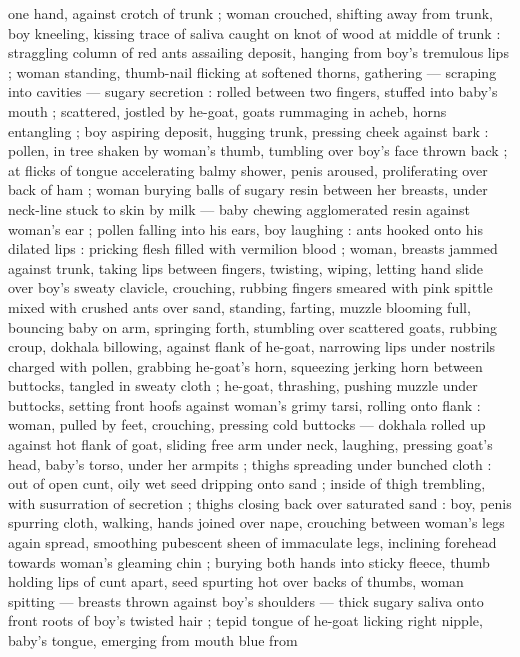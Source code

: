 one hand, against crotch of trunk ; woman crouched, shifting away 
from trunk, boy kneeling, kissing trace of saliva caught on knot of 
wood at middle of trunk : straggling column of red ants assailing 
deposit, hanging from boy's tremulous lips ; woman standing, 
thumb-nail flicking at softened thorns, gathering --- scraping into 
cavities --- sugary secretion : rolled between two fingers, stuffed into 
baby's mouth ; scattered, jostled by he-goat, goats rummaging in 
acheb, horns entangling ; boy aspiring deposit, hugging trunk, 
pressing cheek against bark : pollen, in tree shaken by woman's 
thumb, tumbling over boy's face thrown back ; at flicks of tongue 
accelerating balmy shower, penis aroused, proliferating over back of 
ham ; woman burying balls of sugary resin between her breasts, 
under neck-line stuck to skin by milk --- baby chewing agglomerated 
resin against woman's ear ; pollen falling into his ears, boy laughing 
: ants hooked onto his dilated lips : pricking flesh filled with vermilion 
blood ; woman, breasts jammed against trunk, taking lips between 
fingers, twisting, wiping, letting hand slide over boy's sweaty clavicle, 
crouching, rubbing fingers smeared with pink spittle mixed with 
crushed ants over sand, standing, farting, muzzle blooming full, 
bouncing baby on arm, springing forth, stumbling over scattered 
goats, rubbing croup, dokhala billowing, against flank of he-goat, 
narrowing lips under nostrils charged with pollen, grabbing he-goat's 
horn, squeezing jerking horn between buttocks, tangled in sweaty 
cloth ; he-goat, thrashing, pushing muzzle under buttocks, setting 
front hoofs against woman's grimy tarsi, rolling onto flank : woman, 
pulled by feet, crouching, pressing cold buttocks --- dokhala rolled 
up against hot flank of goat, sliding free arm under neck, laughing, 
pressing goat's head, baby's torso, under her armpits ; thighs 
spreading under bunched cloth : out of open cunt, oily wet seed 
dripping onto sand ; inside of thigh trembling, with susurration of 
secretion ; thighs closing back over saturated sand : boy, penis 
spurring cloth, walking, hands joined over nape, crouching between 
woman's legs again spread, smoothing pubescent sheen of 
immaculate legs, inclining forehead towards woman's gleaming chin 
; burying both hands into sticky fleece, thumb holding lips of cunt 
apart, seed spurting hot over backs of thumbs, woman spitting --- 
breasts thrown against boy's shoulders --- thick sugary saliva onto 
front roots of boy's twisted hair ; tepid tongue of he-goat licking 
right nipple, baby's tongue, emerging from mouth blue from 
